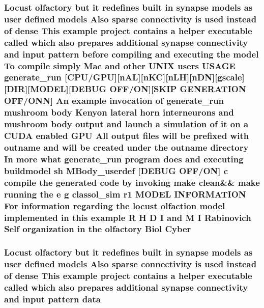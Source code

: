 \hypertarget{userproject_2MBody__userdef__project_2README_8txt_a893b565ffe8c9180322ea39f5e9cfe1c}{
\subsubsection[{Cyber}]{\setlength{\rightskip}{0pt plus 5cm}Locust olfactory but {\bf it} redefines built {\bf in} synapse models as user defined models Also sparse connectivity {\bf is} used instead of dense This example {\bf project} contains a helper executable called which also prepares additional synapse connectivity and input pattern before compiling and executing the {\bf model} To compile simply Mac and other U\+N\+I\+X users U\+S\+A\+G\+E {\bf generate\+\_\+run} \mbox{[}{\bf C\+P\+U}/{\bf G\+P\+U}\mbox{]}\mbox{[}n\+A\+L\mbox{]}\mbox{[}n\+K\+C\mbox{]}\mbox{[}n\+L\+H\mbox{]}\mbox{[}n\+D\+N\mbox{]}\mbox{[}gscale\mbox{]}\mbox{[}D\+I\+R\mbox{]}\mbox{[}M\+O\+D\+E\+L\mbox{]}\mbox{[}D\+E\+B\+U\+G O\+F\+F/O\+N\mbox{]}\mbox{[}S\+K\+I\+P G\+E\+N\+E\+R\+A\+T\+I\+O\+N O\+F\+F/O\+N\+N\mbox{]} An example invocation of {\bf generate\+\_\+run} mushroom body Kenyon lateral horn {\bf interneurons} and mushroom body output and launch a simulation of {\bf it} on a C\+U\+D\+A enabled {\bf G\+P\+U} All output files will be prefixed {\bf with} outname and will be created under the outname {\bf directory} In more what {\bf generate\+\_\+run} program does and executing buildmodel sh M\+Body\+\_\+userdef \mbox{[}D\+E\+B\+U\+G O\+F\+F/O\+N\mbox{]} c compile the generated {\bf code} by invoking make clean\&\& make running the e g classol\+\_\+sim r1 M\+O\+D\+E\+L I\+N\+F\+O\+R\+M\+A\+T\+I\+O\+N For information regarding the locust olfaction {\bf model} implemented {\bf in} this example {\bf R} H D I and M I Rabinovich Self organization {\bf in} the olfactory Biol Cyber}}\label{userproject_2MBody__userdef__project_2README_8txt_a893b565ffe8c9180322ea39f5e9cfe1c}
\hypertarget{userproject_2MBody__userdef__project_2README_8txt_a2c8f0ac6d2a5af52eff55cd5d4c5cca4}{
\subsubsection[{data}]{\setlength{\rightskip}{0pt plus 5cm}Locust olfactory but {\bf it} redefines built {\bf in} synapse models as user defined models Also sparse connectivity {\bf is} used instead of dense This example {\bf project} contains a helper executable called which also prepares additional synapse connectivity and input pattern data}}\label{userproject_2MBody__userdef__project_2README_8txt_a2c8f0ac6d2a5af52eff55cd5d4c5cca4}

